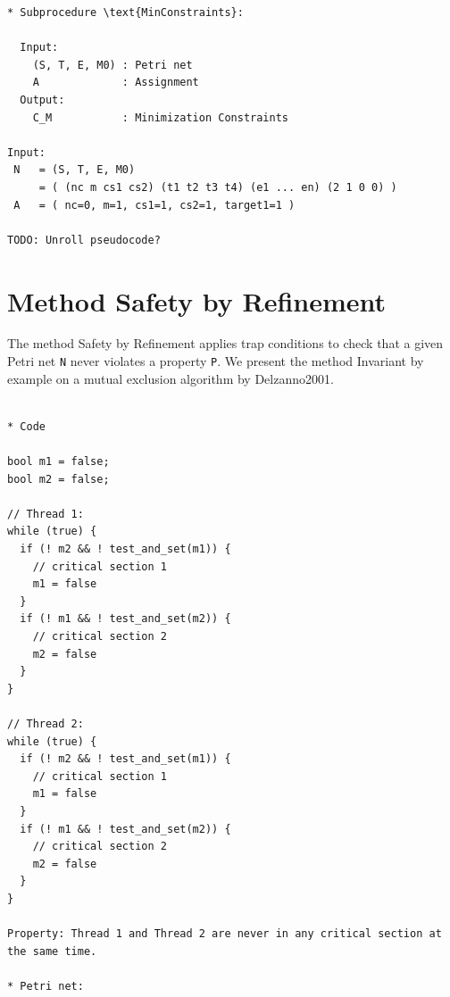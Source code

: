 \documentclass{article}
\begin{document}
\begin{verbatim}
* Subprocedure \text{MinConstraints}:

  Input:
    (S, T, E, M0) : Petri net
    A             : Assignment
  Output:
    C_M           : Minimization Constraints

Input:
 N   = (S, T, E, M0)
     = ( (nc m cs1 cs2) (t1 t2 t3 t4) (e1 ... en) (2 1 0 0) )
 A   = ( nc=0, m=1, cs1=1, cs2=1, target1=1 )

TODO: Unroll pseudocode?

\end{verbatim}

\newpage

\section{Method Safety by Refinement}

The method Safety by Refinement applies trap conditions to check that a given Petri net \verb=N= never violates a property \verb=P=.
We present the method Invariant by example on a mutual exclusion algorithm by Delzanno2001.

\begin{verbatim}

* Code

bool m1 = false;
bool m2 = false;

// Thread 1:
while (true) {
  if (! m2 && ! test_and_set(m1)) {
    // critical section 1
    m1 = false
  }
  if (! m1 && ! test_and_set(m2)) {
    // critical section 2
    m2 = false
  }
}

// Thread 2:
while (true) {
  if (! m2 && ! test_and_set(m1)) {
    // critical section 1
    m1 = false
  }
  if (! m1 && ! test_and_set(m2)) {
    // critical section 2
    m2 = false
  }
}

Property: Thread 1 and Thread 2 are never in any critical section at the same time.

* Petri net:
\end{verbatim}
\begin{center}
\end{center}
\end{document}
